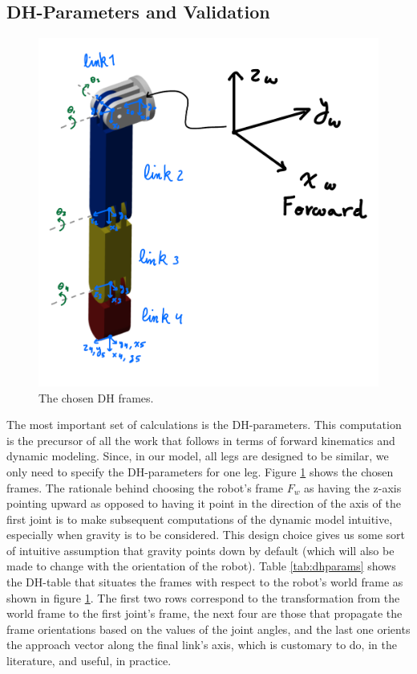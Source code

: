 \subsection{DH-Parameters and Validation} \label{sec:dhparams}
\begin{figure}[thpb]
    \parbox{\linewidth}{\includegraphics[width=\linewidth]{Figures/dhframes.png}}
    \caption{The chosen DH frames.}
    \label{fig:dhframes}
\end{figure}

The most important set of calculations is the DH-parameters. This computation is the precursor of all the work that follows in terms of forward kinematics and dynamic modeling. Since, in our model, all legs are designed to be similar, we only need to specify the DH-parameters for one leg. Figure \ref{fig:dhframes} shows the chosen frames. The rationale behind choosing the robot's frame $F_w$ as having the z-axis pointing upward as opposed to having it point in the direction of the axis of the first joint is to make subsequent computations of the dynamic model intuitive, especially when gravity is to be considered. This design choice gives us some sort of intuitive assumption that gravity points down by default (which will also be made to change with the orientation of the robot).
Table \ref{tab:dhparams} shows the DH-table that situates the frames with respect to the robot's world frame as shown in figure \ref{fig:dhframes}. The first two rows correspond to the transformation from the world frame to the first joint's frame, the next four are those that propagate the frame orientations based on the values of the joint angles, and the last one orients the approach vector along the final link's axis, which is customary to do, in the literature, and useful, in practice.

